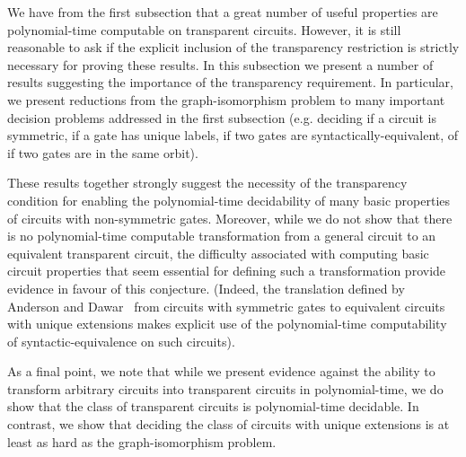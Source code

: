 \documentclass[../paper.tex]{subfiles}
\begin{document}
We have from the first subsection that a great number of useful properties are
polynomial-time computable on transparent circuits. However, it is still
reasonable to ask if the explicit inclusion of the transparency restriction is
strictly necessary for proving these results. In this subsection we present a
number of results suggesting the importance of the transparency requirement. In
particular, we present reductions from the graph-isomorphism problem to many
important decision problems addressed in the first subsection (e.g. deciding if
a circuit is symmetric, if a gate has unique labels, if two gates are
syntactically-equivalent, of if two gates are in the same orbit).

These results together strongly suggest the necessity of the transparency
condition for enabling the polynomial-time decidability of many basic properties
of circuits with non-symmetric gates. Moreover, while we do not show that there
is no polynomial-time computable transformation from a general circuit to an
equivalent transparent circuit, the difficulty associated with computing basic
circuit properties that seem essential for defining such a transformation
provide evidence in favour of this conjecture. (Indeed, the translation defined
by Anderson and Dawar~\cite{AndersonD17} from circuits with symmetric gates to
equivalent circuits with unique extensions makes explicit use of the
polynomial-time computability of syntactic-equivalence on such circuits).

As a final point, we note that while we present evidence against the ability to
transform arbitrary circuits into transparent circuits in polynomial-time, we do
show that the class of transparent circuits is polynomial-time decidable. In
contrast, we show that deciding the class of circuits with unique extensions is
at least as hard as the graph-isomorphism problem.

\end{document}
